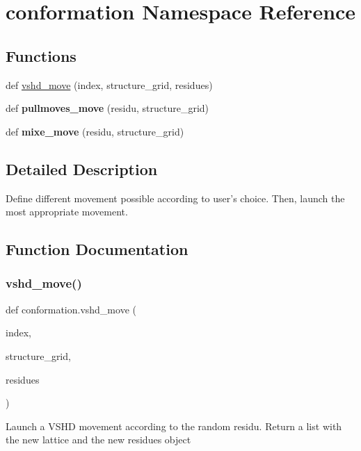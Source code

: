 \hypertarget{namespaceconformation}{}\section{conformation Namespace Reference}
\label{namespaceconformation}
\subsection*{Functions}
\begin{DoxyCompactItemize}
\item 
def \hyperlink{namespaceconformation_a68e0c087ab604cbc37a7fe9a27622d8c}{vshd\+\_\+move} (index, structure\+\_\+grid, residues)
\item 
\mbox{\label{namespaceconformation_aff463b8b684c4af25a3016b5e9bde9a7}} 
def {\bfseries pullmoves\+\_\+move} (residu, structure\+\_\+grid)
\item 
\mbox{\label{namespaceconformation_aff776064950617ef8272323343ef9a95}} 
def {\bfseries mixe\+\_\+move} (residu, structure\+\_\+grid)
\end{DoxyCompactItemize}


\subsection{Detailed Description}
\begin{DoxyVerb}    Define different movement possible according to user's choice.
    Then, launch the most appropriate movement.
\end{DoxyVerb}
 

\subsection{Function Documentation}
\mbox{\label{namespaceconformation_a68e0c087ab604cbc37a7fe9a27622d8c}} 
\subsubsection{\texorpdfstring{vshd\+\_\+move()}{vshd\_move()}}
{\footnotesize\ttfamily def conformation.\+vshd\+\_\+move (\begin{DoxyParamCaption}\item[{}]{index,  }\item[{}]{structure\+\_\+grid,  }\item[{}]{residues }\end{DoxyParamCaption})}

\begin{DoxyVerb}Launch a VSHD movement according to the random residu.
    Return a list with the new lattice and  the new residues object
\end{DoxyVerb}
 